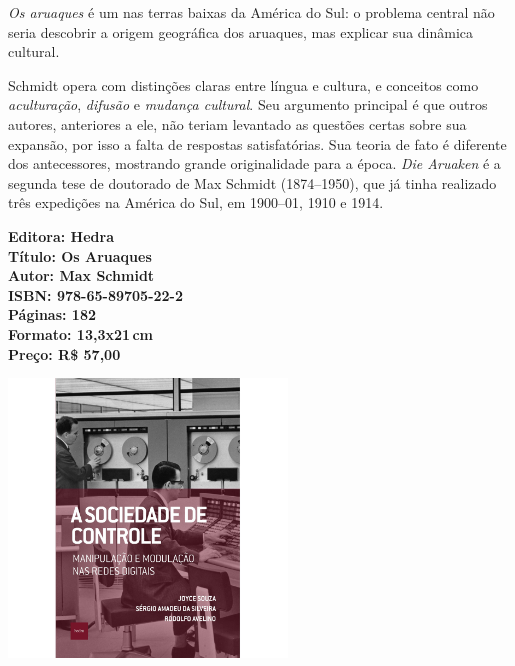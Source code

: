 \noindent{}\textit{Os aruaques} é um  nas terras baixas da América do Sul: o problema central não seria descobrir a origem geográfica dos aruaques, mas explicar sua dinâmica cultural. 

Schmidt opera com distinções claras entre língua e cultura, e conceitos como \textit{aculturação}, \textit{difusão} e \textit{mudança cultural}. Seu argumento principal é que outros autores, anteriores a ele, não teriam levantado as questões certas sobre sua expansão, por isso a falta de respostas satisfatórias. Sua teoria de fato é diferente dos antecessores, mostrando grande originalidade para a época. \textit{Die Aruaken} é a segunda tese de doutorado de Max Schmidt (1874--1950), que já tinha realizado três expedições na América do Sul, em 1900--01, 1910 e 1914.

\vfill
\noindent\begin{minipage}[c]{1\linewidth}
{\small\textbf{
\hspace*{-.1cm}Editora: Hedra\\
Título: Os Aruaques\\
Autor: Max Schmidt\\ 
ISBN: 978-65-89705-22-2\\
Páginas: 182\\
Formato: 13,3x21\,cm\\
Preço: R\$ 57,00\\
}}
\end{minipage}
\pagebreak

\begin{center}
\hspace*{-3.6cm}
\hspace*{3.1cm}\includegraphics[width=74mm]{./CAPAS/HEDRA_SOCIEDADE.jpg}
\end{center}
\hspace*{-7cm}\hrulefill\hspace*{-7cm}
\medskip

